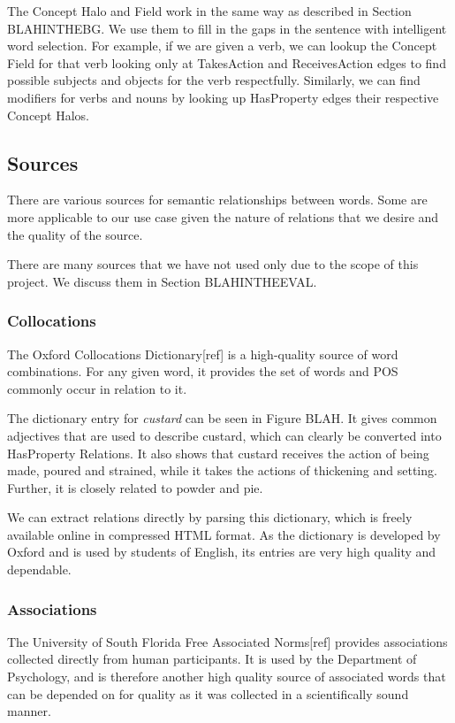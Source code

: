 The Concept Halo and Field work in the same way as described in Section BLAHINTHEBG. We use them to fill in the gaps in the sentence with intelligent word selection. For example, if we are given a verb, we can lookup the Concept Field for that verb looking only at TakesAction and ReceivesAction edges to find possible subjects and objects for the verb respectfully. Similarly, we can find modifiers for verbs and nouns by looking up HasProperty edges their respective Concept Halos.

\subsection{Sources}
There are various sources for semantic relationships between words. Some are more applicable to our use case given the nature of relations that we desire and the quality of the source.

There are many sources that we have not used only due to the scope of this project. We discuss them in Section BLAHINTHEEVAL.

\subsubsection{Collocations}
The Oxford Collocations Dictionary[ref] is a high-quality source of word combinations. For any given word, it provides the set of words and POS commonly occur in relation to it.

The dictionary entry for \textit{custard} can be seen in Figure BLAH. It gives common adjectives that are used to describe custard, which can clearly be converted into HasProperty Relations. It also shows that custard receives the action of being made, poured and strained, while it takes the actions of thickening and setting. Further, it is closely related to powder and pie.

We can extract relations directly by parsing this dictionary, which is freely available online in compressed HTML format. As the dictionary is developed by Oxford and is used by students of English, its entries are very high quality and dependable.

\subsubsection{Associations}
The University of South Florida Free Associated Norms[ref] provides associations collected directly from human participants. It is used by the Department of Psychology, and is therefore another high quality source of associated words that can be depended on for quality as it was collected in a scientifically sound manner.

